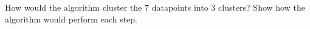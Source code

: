 How would the algorithm cluster the $7$ datapoints into $3$ clusters? Show how the algorithm would perform each step.
